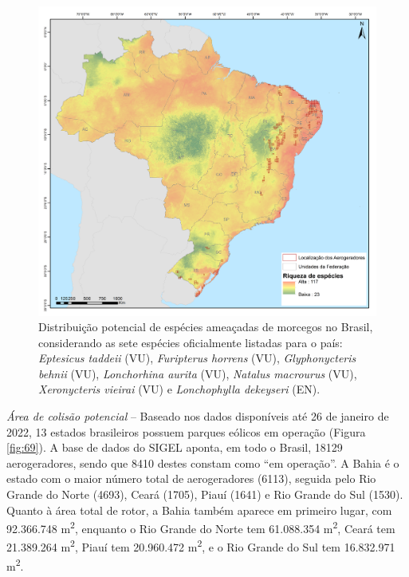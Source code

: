 \documentclass[
  oneside]{scrbook}
\begin{document}
\begin{figure}[H]

{\centering \includegraphics[width=0.75\linewidth]{imagens/cap09/Figura_9.2} 

}

\caption{Distribuição potencial de espécies ameaçadas de morcegos no Brasil, considerando as sete espécies oficialmente listadas para o país: \emph{Eptesicus taddeii} (VU), \emph{Furipterus horrens} (VU), \emph{Glyphonycteris behnii} (VU), \emph{Lonchorhina aurita} (VU), \emph{Natalus macrourus} (VU), \emph{Xeronycteris vieirai} (VU) e \emph{Lonchophylla dekeyseri} (EN).}\label{fig:68}
\end{figure}



\emph{Área de colisão potencial} -- Baseado nos dados disponíveis até 26 de janeiro de 2022, 13 estados brasileiros possuem parques eólicos em operação (Figura \ref{fig:69}). A base de dados do SIGEL aponta, em todo o Brasil, 18129 aerogeradores, sendo que 8410 destes constam como ``em operação''. A Bahia é o estado com o maior número total de aerogeradores (6113), seguida pelo Rio Grande do Norte (4693), Ceará (1705), Piauí (1641) e Rio Grande do Sul (1530). Quanto à área total de rotor, a Bahia também aparece em primeiro lugar, com 92.366.748 m\textsuperscript{2}, enquanto o Rio Grande do Norte tem 61.088.354 m\textsuperscript{2}, Ceará tem 21.389.264 m\textsuperscript{2}, Piauí tem 20.960.472 m\textsuperscript{2}, e o Rio Grande do Sul tem 16.832.971 m\textsuperscript{2}.
\end{document}
